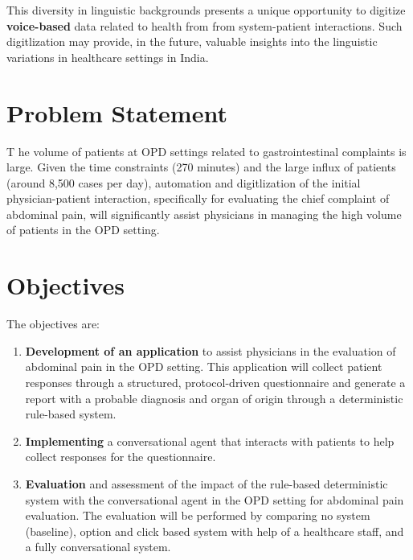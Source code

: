 \noindent This diversity in linguistic backgrounds presents a unique opportunity to digitize \textcolor{TUMRed}{\textbf{voice-based}} data related to health from from system-patient interactions. Such digitlization may provide, in the future, valuable insights into the linguistic variations in healthcare settings in India.

\section{Problem Statement}
\lettrine{T}{ }he volume of patients at OPD settings related to gastrointestinal complaints is large. Given the time constraints (270 minutes) and the large influx of patients (around 8,500 cases per day), automation and digitlization of the initial physician-patient interaction, specifically for evaluating the chief complaint of abdominal pain, will significantly assist physicians in managing the high volume of patients in the OPD setting.

\section{Objectives}
The objectives are:
\begin{enumerate}
    \item \textcolor{TUMRed}{\textbf{Development of an application}} to assist physicians in the evaluation of abdominal pain in the OPD setting. This application will collect patient responses through a structured, protocol-driven questionnaire and generate a report with a probable diagnosis and organ of origin through a deterministic rule-based system.
    \item \textcolor{TUMRed}{\textbf{Implementing}} a conversational agent that interacts with patients to help collect responses for the questionnaire.
    \item \textcolor{TUMRed}{\textbf{Evaluation}} and assessment of the impact of the rule-based deterministic system with the conversational agent in the OPD setting for abdominal pain evaluation. The evaluation will be performed by comparing no system (baseline), option and click based system with help of a healthcare staff, and a fully conversational system.
\end{enumerate}
